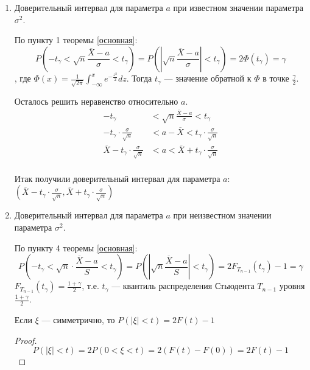 \begin{enumerate}
    \item Доверительный интервал для параметра \(a\) при известном значении параметра \(\sigma^2\).

          По пункту 1 теоремы \ref{основная}:
          \[
              P\left( - t_\gamma < \sqrt{n} \frac{ \overline{X} - a}{\sigma} < t_\gamma\right) = P\left(\left|\sqrt{n} \frac{ \overline{X} - a}{\sigma}\right| < t_\gamma\right) = 2 \Phi(t_\gamma) = \gamma
          \]
          , где \(\Phi(x) = \frac{1}{\sqrt{2 \pi}} \int_{ - \infty }^x e^{ - \frac{z^2}{2}} dz\). Тогда \(t_\gamma\) --- значение обратной к \(\Phi\) в точке \(\frac{\gamma}{2}\). \?

          Осталось решить неравенство относительно \(a\).
          \begin{align*}
              - t_\gamma                                           & < \sqrt{n} \frac{ \overline{X} - a}{\sigma} < t_\gamma      \\
              - t_\gamma \cdot \frac{\sigma}{\sqrt{n}}             & < a - \overline{X} < t_\gamma \cdot \frac{\sigma}{\sqrt{n}} \\
              \overline{X}- t_\gamma \cdot \frac{\sigma}{\sqrt{n}} & < a < \overline{X} + t_\gamma \cdot \frac{\sigma}{\sqrt{n}} \\
          \end{align*}

          Итак получили доверительный интервал для параметра \(a\): \(\left(\overline{X} - t_\gamma \cdot \frac{\sigma}{\sqrt{n}}, \overline{X} + t_\gamma \cdot \frac{\sigma}{\sqrt{n}}\right)\)

    \item Доверительный интервал для параметра \(a\) при неизвестном значении параметра \(\sigma^2\).

          По пункту 4 теоремы \ref{основная}:
          \[
              P\left( -t_\gamma < \sqrt{n} \cdot \frac{ \overline{X} - a}{S} < t_\gamma\right) = P\left(\left|\sqrt{n} \frac{ \overline{X} - a}{S}\right| < t_\gamma\right) = 2 F_{T_{n-1}}(t_\gamma) - 1 = \gamma
          \]
          \(F_{T_{n-1}}(t_\gamma) = \frac{1 + \gamma}{2}\), т.е. \(t_\gamma\) --- квантиль распределения Стьюдента \(T_{n-1}\) уровня \(\frac{1 + \gamma}{2}\).

          \begin{remark}
              Если \(\xi\) --- симметрично, то \(P(|\xi| < t) = 2 F(t) - 1\)
          \end{remark}
          \begin{proof}
              \[P(|\xi| < t) = 2 P(0 < \xi < t) = 2(F(t) - F(0)) = 2F(t) - 1\]
          \end{proof}


\end{enumerate}
